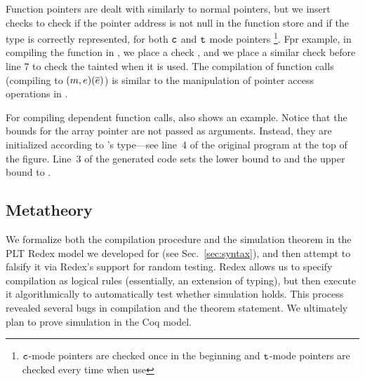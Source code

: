 %
Function pointers are dealt with similarly to normal pointers,
but we insert checks to check if the pointer address is not null in 
the function store and if the type is correctly represented, 
for both $\texttt{c}$ and $\texttt{t}$ mode pointers 
\footnote{$\texttt{c}$-mode pointers are checked once in the beginning and $\texttt{t}$-mode pointers are checked every time when use}.
Fpr example, in compiling the  function in ,
we place a check ,
and we place a similar check before  line 7 to check the tainted  when it is used. 
The compilation of function calls (compiling to ${(m,e)}({\overline{e}})$) 
is similar to the manipulation of pointer access operations in .

For compiling dependent function calls,
 also shows an example.
Notice that the bounds for the array pointer  are not passed as
arguments. Instead, they are initialized according to 's
type---see line~4 of the original \lang program at the top of the figure.
Line~$3$ of the generated code
sets the lower bound  to  and the
upper bound to .

\subsection{Metatheory}
\label{sec:meta}


We formalize both the compilation procedure and the simulation
theorem in the PLT Redex model we developed for \lang (see Sec.~\ref{sec:syntax}),
and then attempt to falsify it via Redex's support for random
testing. Redex allows us
  to specify compilation as logical rules (essentially, an extension
  of typing), but then execute it algorithmically to
  automatically test whether simulation holds. This process revealed
  several bugs in compilation and the theorem statement.
%
We ultimately plan to prove simulation in the Coq model.

